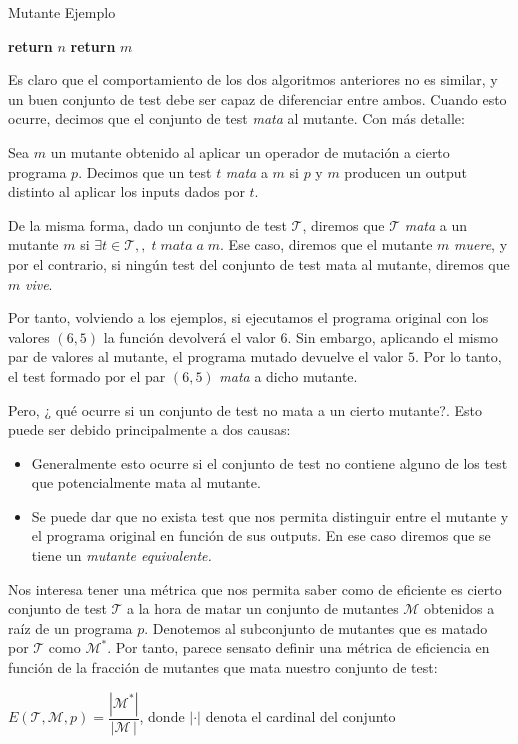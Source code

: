 \begin{algorithm}
\caption{Mutante Ejemplo}
\begin{algorithmic}[1]
    \State  \textbf{return} $n$
\Else
    \State \textbf{return} $m$
\EndIf
\EndProcedure
\end{algorithmic}
\end{algorithm}

Es claro que el comportamiento de los dos algoritmos anteriores no es similar, y un buen conjunto de test debe ser capaz de diferenciar entre ambos. Cuando esto ocurre, decimos que el conjunto de test \textit{mata} al mutante. Con más detalle:

\begin{definition}
Sea $m$ un mutante obtenido al aplicar un operador de mutación a cierto programa $p$.
Decimos que un test $t$ \emph{mata} a $m$ si $p$ y $m$ producen un output distinto al aplicar los inputs dados por $t$.
\end{definition}

De la misma forma, dado un conjunto de test $\mathcal{T}$, diremos que $\mathcal{T}$ \textit{mata} a un mutante $m$ si $\exists t\in \mathcal{T},,\; t \; mata \;a\; m$. Ese caso, diremos que el mutante $m$ \emph{muere}, y por el contrario, si ningún test del conjunto de test mata al mutante, diremos que $m$ \emph{vive}.

Por tanto, volviendo a los ejemplos, si ejecutamos el programa original con los valores $(6,5)$ la función devolverá el valor $6$. Sin embargo, aplicando el mismo par de valores al mutante, el programa mutado devuelve el valor $5$. Por lo tanto, el test formado por el par $(6,5)$ \emph{mata} a dicho mutante.

Pero, ¿ qué ocurre si un conjunto de test no mata a un cierto mutante?. Esto puede ser debido principalmente a dos causas:
\begin{itemize}
\item Generalmente esto ocurre si el conjunto de test no contiene alguno de los test que potencialmente mata al mutante.
\item Se puede dar que no exista test que nos permita distinguir entre el mutante y el programa original en función de sus outputs. En ese caso diremos que se tiene un  \emph{mutante equivalente.}
\end{itemize}

Nos interesa tener una métrica que nos permita saber como de eficiente es cierto conjunto de test $\mathcal{T}$ a la hora de matar un conjunto de mutantes $\mathcal{M}$ obtenidos a raíz de un programa $p$. Denotemos al subconjunto de mutantes que es matado por $\mathcal{T}$ como $\mathcal{M}^*$. Por tanto, parece sensato definir una métrica de eficiencia en función de la fracción de mutantes que mata nuestro conjunto de test:
\begin{center}
$E(\mathcal{T},\mathcal{M},p) = \dfrac{|\mathcal{M}^*|}{|\mathcal{M} \,|}$, donde $|\cdot|$ denota el cardinal del conjunto
\end{center}

